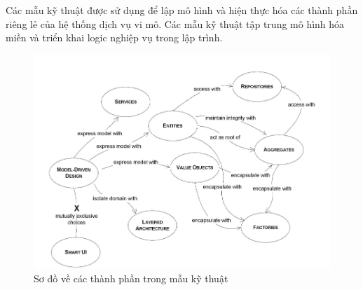 Các mẫu kỹ thuật được sử dụng để lập mô hình và hiện thực hóa các thành phần riêng lẻ của hệ thống dịch vụ vi mô. Các mẫu kỹ thuật tập trung mô hình hóa miền và triển khai logic nghiệp vụ trong lập trình.

\begin{figure}[H]

\centering

\includegraphics[scale = 0.5]{pictures/cac_mau_ky_thuat/temp.png}

\caption{Sơ đồ về các thành phần trong mẫu kỹ thuật}

\end{figure}